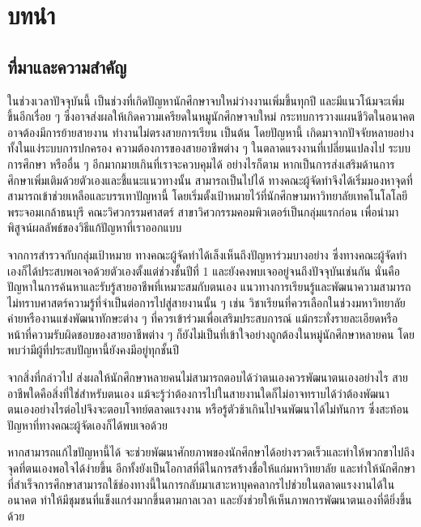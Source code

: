 \chapter{บทนำ}

\section{ที่มาและความสำคัญ}


ในช่วงเวลาปัจจุบันนี้ เป็นช่วงที่เกิดปัญหานักศึกษาจบใหม่ว่างงานเพิ่มขึ้นทุกปี \cite{mrgonline} และมีแนวโน้มจะเพิ่มขึ้นอีกเรื่อย ๆ ซึ่งอาจส่งผลให้เกิดความเครียดในหมูนักศึกษาจบใหม่ กระทบการวางแผนชีวิตในอนาคต อาจต้องมีการย้ายสายงาน ทำงานไม่ตรงสายการเรียน เป็นต้น โดยปัญหานี้ เกิดมาจากปัจจัยหลายอย่างทั้งในแง่ระบบการปกครอง ความต้องการของสายอาชีพต่าง ๆ ในตลาดแรงงานที่เปลี่ยนแปลงไป ระบบการศึกษา หรืออื่น ๆ อีกมากมายเกินที่เราจะควบคุมได้ อย่างไรก็ตาม หากเป็นการส่งเสริมด้านการศึกษาเพิ่มเติมด้วยตัวเองและชี้แนะแนวทางนั้น สามารถเป็นไปได้ ทางคณะผู้จัดทำจึงได้เริ่มมองหาจุดที่สามารถเข้าช่วยเหลือและบรรเทาปัญหานี้ โดยเริ่มตั้งเป้าหมายไว้ที่นักศึกษามหาวิทยาลัยเทคโนโลโลยีพระจอมเกล้าธนบุรี คณะวิศวกรรมศาสตร์ สาขาวิศวกรรมคอมพิวเตอร์เป็นกลุ่มแรกก่อน เพื่อนำมาพิสูจน์ผลลัพธ์ของวิธีแก้ปัญหาที่เราออกแบบ

จากการสำรวจกับกลุ่มเป้าหมาย ทางคณะผู้จัดทำได้เล็งเห็นถึงปัญหาร่วมบางอย่าง ซึ่งทางคณะผู้จัดทำเองก็ได้ประสบพอเจอด้วยตัวเองตั้งแต่ช่วงชั้นปีที่ 1 และยังคงพบเจออยู่จนถึงปัจจุบันเช่นกัน นั่นคือปัญหาในการค้นหาและรับรู้สายอาชีพที่เหมาะสมกับตนเอง แนวทางการเรียนรู้และพัฒนาความสามารถ ไม่ทราบศาสตร์ความรู้ที่จำเป็นต่อการไปสู่สายงานนั้น ๆ เช่น วิชาเรียนที่ควรเลือกในช่วงมหาวิทยาลัย ค่ายหรืองานแข่งพัฒนาทักษะต่าง ๆ ที่ควรเข้าร่วมเพื่อเสริมประสบการณ์ แม้กระทั่งรายละเอียดหรือหน้าที่ความรับผิดชอบของสายอาชีพต่าง ๆ ก็ยังไม่เป็นที่เข้าใจอย่างถูกต้องในหมู่นักศึกษาหลายคน โดยพบว่ามีผู้ที่ประสบปัญหานี้ยังคงมีอยู่ทุกชั้นปี

จากสิ่งที่กล่าวไป ส่งผลให้นักศึกษาหลายคนไม่สามารถตอบได้ว่าตนเองควรพัฒนาตนเองอย่างไร สายอาชีพใดคือสิ่งที่ใช่สำหรับตนเอง แม้จะรู้ว่าต้องการไปในสายงานใดก็ไม่อาจทราบได้ว่าต้องพัฒนาตนเองอย่างไรต่อไปจึงจะตอบโจทย์ตลาดแรงงาน หรือรู้ตัวช้าเกินไปจนพัฒนาได้ไม่ทันการ ซึ่งสะท้อนปัญหาที่ทางคณะผู้จัดเองก็ได้พบเจอด้วย

หากสามารถแก้ไขปัญหานี้ได้ จะช่วยพัฒนาศักยภาพของนักศึกษาได้อย่างรวดเร็วและทำให้พวกขาไปถึงจุดที่ตนเองพอใจได้ง่ายขึ้น อีกทั้งยังเป็นโอกาสที่ดีในการสร้างชื่อให้แก่มหาวิทยาลัย และทำให้นักศึกษาที่สำเร็จการศึกษาสามารถใช้ช่องทางนี้ในการกลับมาเสาะหาบุคคลากรไปช่วยในตลาดแรงงานได้ในอนาคต ทำให้มีชุมชนที่แข็งแกร่งมากขึ้นตามกาลเวลา และยังช่วยให้เห็นภาพการพัฒนาตนเองที่ดียิ่งขึ้นด้วย

